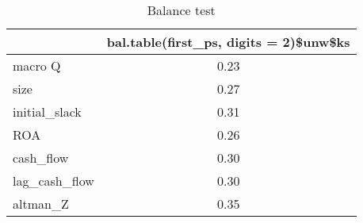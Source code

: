 \begin{table}[ht]
\centering
\caption{Balance test} 
\label{tab:balance}
\begingroup\footnotesize
\begin{tabular}{lc}
  \hline
 & bal.table(first\_ps, digits = 2)\$unw\$ks \\ 
  \hline
macro Q & 0.23 \\ 
  size & 0.27 \\ 
  initial\_slack & 0.31 \\ 
  ROA & 0.26 \\ 
  cash\_flow & 0.30 \\ 
  lag\_cash\_flow & 0.30 \\ 
  altman\_Z & 0.35 \\ 
   \hline
\end{tabular}
\endgroup
\end{table}
